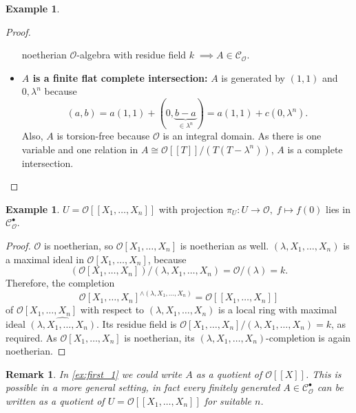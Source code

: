 \documentclass{article}
\theoremstyle{plain}%
\newtheorem{remark}[theorem]{Remark}
\theoremstyle{definition}
\newtheorem{example}[theorem]{Example}
\theoremstyle{remark}
\newcommand{\cob}{\mathcal{C}_\mathcal{O}^\bullet}
\newcommand{\co}{\mathcal{C}_\mathcal{O}}
\begin{document}
\begin{example}
\begin{proof}
\begin{itemize}
                noetherian \(\mathcal{O}\)-algebra with residue field \(k\; \implies A \in \co\). 
            \item \textbf{\(A\) is a finite flat complete intersection:}
                \(A\) is generated by \((1,1)\) and \(0, \lambda^n\) because
                \[
                    (a,b) = a(1,1) + (0, \underbrace{b-a}_{\in \lambda^n}) = a(1,1) + c(0, \lambda^n).
                \]
                Also, \(A\) is torsion-free because \(\mathcal{O}\) is an integral domain. 
                As there is one variable and one relation in \(A \cong \mathcal{O}[[T]]/(T(T-\lambda^n))\),
                \(A\) is a complete intersection.
        \end{itemize}
    \end{proof}
\end{example}


\begin{example}\label{ex:last_1}\cite[cf.][example 5]{Darmon1995}
    \(U = \mathcal{O}[[X_1, \dots, X_n]]\) with projection \(\pi_U\colon U \to \mathcal{O},\; f \mapsto f(0)\) lies in \(\cob\).
    \begin{proof}
        \(\mathcal{O}\) is noetherian, so \(\mathcal{O}[X_1, \dots, X_{n}]\) is noetherian as well.
        \((\lambda, X_1, \dots, X_n)\) is a maximal ideal in \(\mathcal{O}[X_1, \dots, X_n]\), because
        \[\left(\mathcal{O}[X_1, \dots, X_n]\right)/(\lambda, X_1, \dots, X_n) = \mathcal{O}/(\lambda) = k.\]
        Therefore, the completion \[\mathcal{O}[X_1, \dots, X_n]^{\wedge(\lambda, X_1, \dots, X_n)} = \mathcal{O}[[X_1, \dots, X_n]]\]
        of \(\mathcal{O}[X_1, \dots, X_n]\) with respect to \((\lambda, X_1, \dots, X_n)\) is a local ring with maximal ideal
        \(\widehat{(\lambda, X_1, \dots, X_n)}\).
        Its residue field is \(\mathcal{O}[X_1, \dots, X_n]/(\lambda, X_1, \dots, X_n) = k\), as required.
        As \(\mathcal{O}[X_1, \dots, X_n]\) is noetherian, its \((\lambda, X_1, \dots, X_n)\)-completion is again noetherian.
    \end{proof}
\end{example}

\begin{remark}\label{rem:quotientofU}
    In \cref{ex:first_1} we could write \(A\) as a quotient of \(\mathcal{O}[[X]]\). 
    This is possible in a more general setting, in fact every finitely generated \(A \in \cob\) 
    can be written as a quotient of
    \(U = \mathcal{O}[[X_1, \dots, X_n]]\) for suitable \(n\).
\end{remark}
\end{document}
